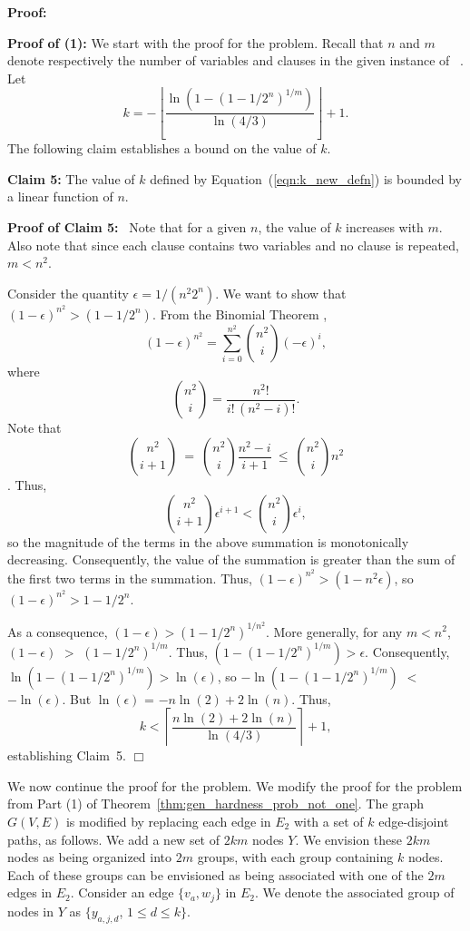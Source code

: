 \noindent
\textbf{Proof:}~  

\noindent
\textbf{Proof of (1):}
We start with the proof for the \TwoNewInfv{} problem.
Recall that $n$ and $m$ denote respectively the number of variables and
clauses in the given instance of~ \mtsat.
Let
\begin{equation}\label{eqn:k_new_defn}
k = - \left\lfloor \frac{\ln (1- (1-1/2^n)^{1/m} )}{\ln(4/3)} 
        \right\rfloor + 1.
\end{equation}
The following claim establishes a bound on the value of $k$.

\medskip
\noindent
\textbf{Claim 5:} The value of
$k$ defined by Equation~(\ref{eqn:k_new_defn})
is bounded by a linear function of $n$.

\medskip
\noindent
\textbf{Proof of Claim 5:}~
Note that for a given $n$, the value of $k$ increases with $m$.
Also note that since each clause contains two variables and
no clause is repeated, $m < n^2$.

Consider the quantity $\epsilon = 1/(n^2 2^n)$.
We want to show that $(1 - \epsilon)^{n^2} > (1-1/2^n)$.
From the Binomial Theorem \cite{Rosen-2011},
$$(1 - \epsilon)^{n^2} = \sum_{i=0}^{n^2} {n^2 \choose i}{(- \epsilon)}^i,$$
where 
$${n^2 \choose i} = \frac{n^2!}{i! \, (n^2-i)!}.$$
Note that 
$${n^2 \choose i+1} ~=~ 
{n^2 \choose i} \frac{n^2-i}{i+1} ~\leq~ {n^2 \choose i} n^2$$.
Thus,
$${n^2 \choose i+1} {\epsilon}^{i+1} < {n^2 \choose i} {\epsilon}^i,$$
so the magnitude of the terms in the above summation is 
monotonically decreasing.
Consequently, the value of the summation is greater than 
the sum of the first two terms in the summation.
Thus, $(1 - \epsilon)^{n^2} > (1 - n^2 \epsilon)$, 
so  $(1 - \epsilon)^{n^2} > 1-1/2^n$.

As a consequence, $(1 - \epsilon) > (1-1/2^n)^{1/{n^2}}$.
More generally, for any $m < n^2$,
$(1 - \epsilon)$ $>$ \mbox{$(1-1/2^n)^{1/m}$}.
Thus, $(1- (1-1/2^n)^{1/m} ) > \epsilon$.
Consequently, $\ln (1- (1-1/2^n)^{1/m} ) > \ln (\epsilon)$,
so \mbox{$- \ln (1- (1-1/2^n)^{1/m})$} $<$ $-\ln (\epsilon)$.
But $\ln (\epsilon)$ = $-n \ln (2) + 2  \ln (n)$.
Thus, 
$$k <  \left\lceil \frac{n \ln (2) + 2  \ln (n)}{\ln(4/3)} \right\rceil+ 1,$$
establishing Claim~5. \hfill $\Box$

\medskip
We now continue the proof for the \ThrNewInfv{} problem.
We modify the proof for the \TwoNewInfv{} problem from Part (1) of 
Theorem~\ref{thm:gen_hardness_prob_not_one}.  
The graph $G(V,E)$ is
modified by replacing each edge in $E_2$ with a set of
$k$ edge-disjoint paths, as follows.  
We add a new set of $2km$ nodes $Y$.  
We envision these $2km$ nodes as being organized 
into $2m$ groups, with each group containing $k$ nodes.  
Each of these groups can be envisioned
as being associated with one of the $2m$ edges in $E_2$.  
Consider an edge $\{v_a, w_j\}$ in $E_2$.  
We denote the associated group
of nodes in $Y$ as $\{ y_{a, j,d}$, $1 \leq d \leq k \}$.

